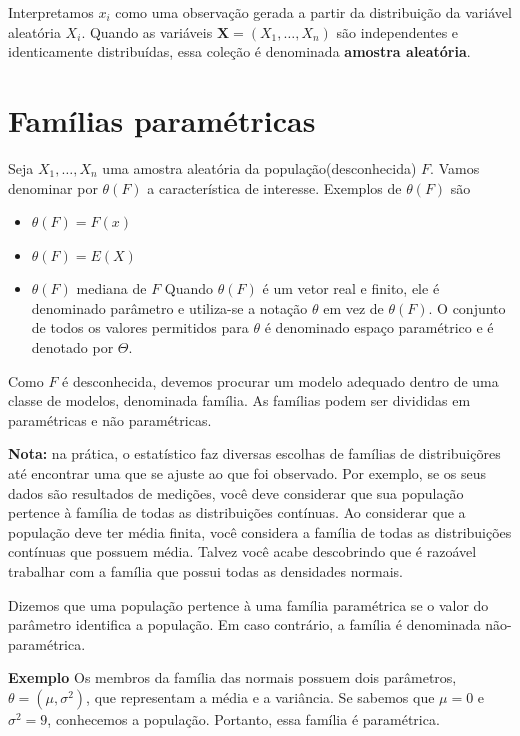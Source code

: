 \documentclass[
  letterpaper,
  DIV=11,
  numbers=noendperiod]{scrartcl}
\providecommand{\tightlist}{%
  \setlength{\itemsep}{0pt}\setlength{\parskip}{0pt}}\usepackage{longtable,booktabs,array}
\begin{document}
Interpretamos \(x_i\) como uma observação gerada a partir da
distribuição da variável aleatória \(X_i\). Quando as variáveis
\(\textbf{X}=(X_1,\ldots,X_n)\) são independentes e identicamente
distribuídas, essa coleção é denominada \textbf{amostra aleatória}.

\section{Famílias paramétricas}\label{famuxedlias-paramuxe9tricas}

Seja \(X_1,\ldots,X_n\) uma amostra aleatória da população(desconhecida)
\(F\). Vamos denominar por \(\theta(F)\) a característica de interesse.
Exemplos de \(\theta(F)\) são

\begin{itemize}
\tightlist
\item
  \(\theta(F)=F(x)\)
\item
  \(\theta(F)=E(X)\)
\item
  \(\theta(F)\) mediana de \(F\) Quando \(\theta(F)\) é um vetor real e
  finito, ele é denominado parâmetro e utiliza-se a notação \(\theta\)
  em vez de \(\theta(F)\). O conjunto de todos os valores permitidos
  para \(\theta\) é denominado espaço paramétrico e é denotado por
  \(\Theta\).
\end{itemize}

Como \(F\) é desconhecida, devemos procurar um modelo adequado dentro de
uma classe de modelos, denominada família. As famílias podem ser
divididas em paramétricas e não paramétricas.

\textbf{Nota:} na prática, o estatístico faz diversas escolhas de
famílias de distribuiçõres até encontrar uma que se ajuste ao que foi
observado. Por exemplo, se os seus dados são resultados de medições,
você deve considerar que sua população pertence à família de todas as
distribuições contínuas. Ao considerar que a população deve ter média
finita, você considera a família de todas as distribuições contínuas que
possuem média. Talvez você acabe descobrindo que é razoável trabalhar
com a família que possui todas as densidades normais.

Dizemos que uma população pertence à uma família paramétrica se o valor
do parâmetro identifica a população. Em caso contrário, a família é
denominada não-paramétrica.

\textbf{Exemplo} Os membros da família das normais possuem dois
parâmetros, \(\theta=(\mu,\sigma^2)\), que representam a média e a
variância. Se sabemos que \(\mu=0\) e \(\sigma^2=9\), conhecemos a
população. Portanto, essa família é paramétrica.
\end{document}
